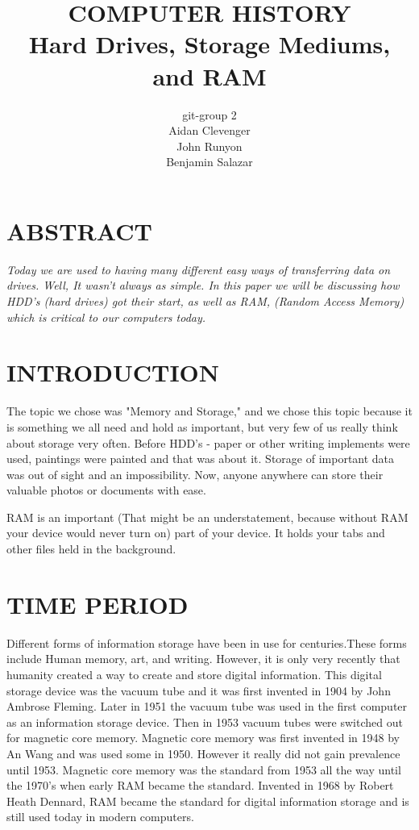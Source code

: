 \documentclass[letterpaper, 10 pt, conference]{IEEEconf}
\title{\LARGE \bf
COMPUTER HISTORY\\
\large Hard Drives, Storage Mediums, and RAM
}
\author{git-group 2\\
\small Aidan Clevenger\\
\small John Runyon\\
\small Benjamin Salazar\\
}
\begin{document}
\maketitle
\thispagestyle{empty}
\pagestyle{empty}


\section*{ABSTRACT}
\textit{
Today we are used to having many different easy ways of transferring data on drives. Well, It wasn't always as simple. In this paper we will be discussing how HDD's (hard drives) got their start, as well as RAM, (Random Access Memory) which is critical to our computers today.
}

\section{INTRODUCTION}

The topic we chose was "Memory and Storage," and we chose this topic because it is something we all need and hold as important, but very few of us really think about storage very often. Before HDD's - paper or other writing implements were used, paintings were painted and that was about it. Storage of important data was out of sight and an impossibility. Now, anyone anywhere can store their valuable photos or documents with ease. 

RAM is an important (That might be an understatement, because without RAM your device would never turn on) part of your device. It holds your tabs and other files held in the background.

\section{TIME PERIOD}
Different forms of information storage have been in use for centuries.These forms include Human memory, art, and writing. However, it is only very recently that humanity created a way to create and store digital information. This digital storage device was the vacuum tube and it was first invented in 1904 by John Ambrose Fleming. Later in 1951 the vacuum tube was used in the first computer as an information storage device. Then in 1953 vacuum tubes were switched out for magnetic core memory. Magnetic core memory was first invented in 1948 by An Wang and was used some in 1950. However it really did not gain prevalence until 1953. Magnetic core memory was the standard from 1953 all the way until the 1970's when early RAM became the standard. Invented in 1968 by Robert Heath Dennard, RAM became the standard for digital information storage and is still used today in modern computers. 
\end{document}
